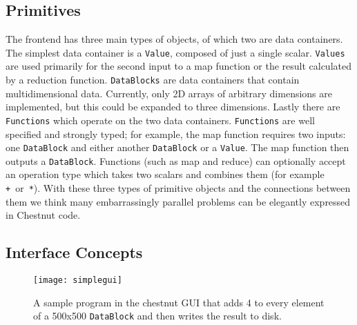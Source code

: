 \documentclass[twocolumn]{article}
\renewcommand{\|}{\origbar} %
\newcommand{\code}[1]{\texttt{#1}}
\begin{document}
\subsection{Primitives}

The frontend has three main types of objects, of which two are data containers. The simplest data container is a \code{Value}, composed of just a single scalar. \code{Values} are used primarily for the second input to a map function or the result calculated by a reduction function. \code{DataBlocks} are data containers that contain multidimensional data. Currently, only 2D arrays of arbitrary dimensions are implemented, but this could be expanded to three dimensions. Lastly there are \code{Functions} which operate on the two data containers. \code{Functions} are well specified and strongly typed; for example, the map function requires two inputs: one \code{DataBlock} and either another \code{DataBlock} or a \code{Value}. The map function then outputs a \code{DataBlock}. Functions (such as map and reduce) can optionally accept an operation type which takes two scalars and combines them (for example \code{+}~or~\code{*}). With these three types of primitive objects and the connections between them we think many embarrassingly parallel problems can be elegantly expressed in Chestnut code.

\subsection{Interface Concepts}

\begin{figure}[h!]
  \centering
    \texttt{[image: simplegui]}
    \caption{A sample program in the chestnut GUI that adds 4 to every element of a 500x500 \code{DataBlock} and then writes the result to disk.}
\end{figure}
\end{document}
